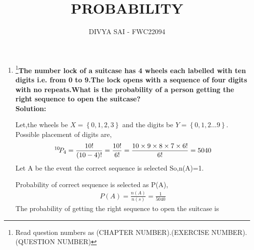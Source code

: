 \documentclass{article}
\providecommand{\cbrak}[1]{\ensuremath{\left\{#1\right\}}}
\newcommand*{\permcomb}[4][0mu]{{{}^{#3}\mkern#1#2_{#4}}}
\newcommand*{\perm}[1][-3mu]{\permcomb[#1]{P}}
\begin{document}
\title{PROBABILITY}
\author{\Large DIVYA SAI - FWC22094}
\date{}

\maketitle
\begin{enumerate}[label=16.\arabic{enumi}.\arabic{enumii}]%
\setcounter{enumi}{3}
\setcounter{enumii}{10}

\item \footnote{Read question numbers as (CHAPTER NUMBER).(EXERCISE NUMBER).(QUESTION NUMBER)}\textbf {The number lock of a suitcase has 4 wheels each labelled with ten digits i.e. from 0 to 9.The lock opens with a sequence of four digits with no repeats.What is the probability of a person getting the right sequence to open the suitcase?}\\[1ex]

\textbf{Solution:}

Let,the wheels be $X =\cbrak{0,1,2,3}$ and the digits be $Y=\cbrak{0,1,2...9}$.
Possible placement of digits are,
\begin{align}
\perm{10}{4}=\frac{10!}{(10-4)!}=\frac{10!}{6!}=\frac{10 \times 9 \times 8 \times 7 \times	 6!}{6!}=5040
\end{align}
Let A be the event the correct sequence is selected So,n(A)=1.

Probability of correct sequence is selected as P(A),
\begin{align}
P(A)=\frac{n(A)}{n(s)}=\frac{1}{5040}
\end{align}
The probability of getting the right sequence to open the suitcase is 
\end{enumerate}
\end{document}
